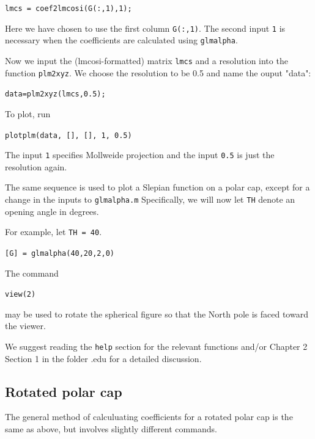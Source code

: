 \documentclass{article}
\begin{document}
\verb!lmcs = coef2lmcosi(G(:,1),1);!

Here we have chosen to use the first column \verb!G(:,1)!. The second input \verb!1! is necessary when the coefficients are calculated using \verb!glmalpha!.

Now we input the (lmcosi-formatted) matrix \verb!lmcs! and a resolution into the function \verb!plm2xyz!. We choose the resolution to be 0.5 and name the ouput "data":

\verb!data=plm2xyz(lmcs,0.5);!

To plot, run

\verb!plotplm(data, [], [], 1, 0.5)!

The input \verb!1! specifies Mollweide projection and the input \verb!0.5! is just the resolution again.

The same sequence is used to plot a Slepian function on a polar cap, except for a change in the inputs to \verb!glmalpha.m! Specifically, we will now let \verb!TH! denote an opening angle in degrees.

For example, let \verb!TH = 40!.

\verb![G] = glmalpha(40,20,2,0)!

The command 

\verb!view(2)!

may be used to rotate the spherical figure so that the North pole is faced toward the viewer.

We suggest reading the \verb!help! section for the relevant functions and/or Chapter 2 Section 1 in the folder .edu for a detailed discussion.

\subsection{Rotated polar cap}

The general method of calculuating coefficients for a rotated polar cap is the same as above, but involves slightly different commands.
\end{document}
